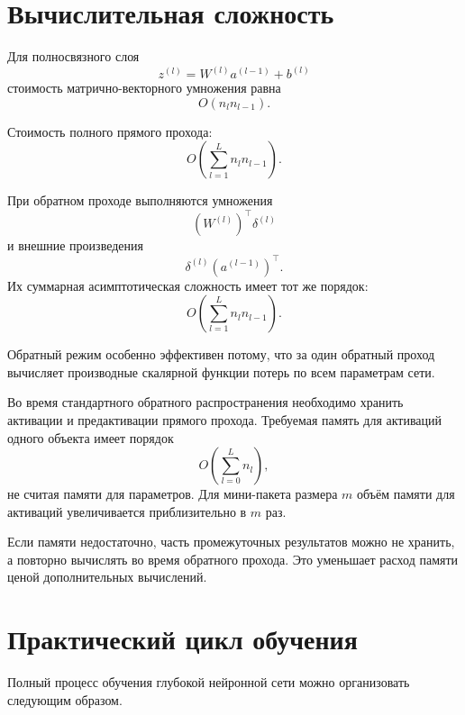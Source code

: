 \documentclass[12pt,a4paper]{article}
\theoremstyle{plain}
\theoremstyle{definition}
\theoremstyle{remark}
\begin{document}
\section{Вычислительная сложность}

Для полносвязного слоя
\[
    z^{(l)}
    =
    W^{(l)}a^{(l-1)}+b^{(l)}
\]
стоимость матрично-векторного умножения равна
\[
    O(n_l n_{l-1}).
\]

Стоимость полного прямого прохода:
\[
    O\left(
        \sum_{l=1}^{L}
        n_l n_{l-1}
    \right).
\]

При обратном проходе выполняются умножения
\[
    (W^{(l)})^\top\delta^{(l)}
\]
и внешние произведения
\[
    \delta^{(l)}(a^{(l-1)})^\top.
\]
Их суммарная асимптотическая сложность имеет тот же порядок:
\[
    O\left(
        \sum_{l=1}^{L}
        n_l n_{l-1}
    \right).
\]

Обратный режим особенно эффективен потому, что за один обратный
проход вычисляет производные скалярной функции потерь по всем
параметрам сети.

Во время стандартного обратного распространения необходимо хранить
активации и предактивации прямого прохода. Требуемая память для
активаций одного объекта имеет порядок
\[
    O\left(
        \sum_{l=0}^{L}n_l
    \right),
\]
не считая памяти для параметров. Для мини-пакета размера $m$ объём
памяти для активаций увеличивается приблизительно в $m$ раз.

Если памяти недостаточно, часть промежуточных результатов можно не
хранить, а повторно вычислять во время обратного прохода. Это
уменьшает расход памяти ценой дополнительных вычислений.

\section{Практический цикл обучения}

Полный процесс обучения глубокой нейронной сети можно организовать
следующим образом.
\end{document}
